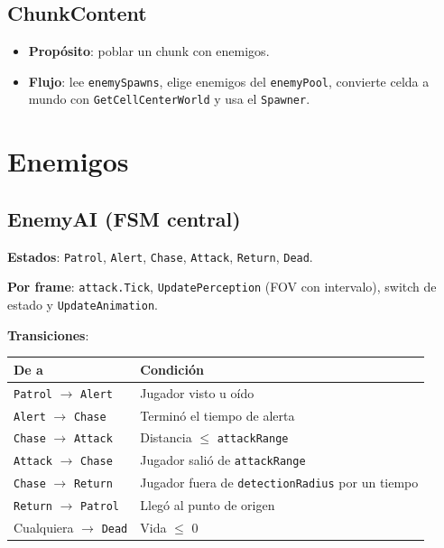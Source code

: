 \documentclass[a4paper,12pt]{article}
\begin{document}
\subsection{ChunkContent}

\begin{itemize}
    \item \textbf{Propósito}: poblar un chunk con enemigos.
    \item \textbf{Flujo}: lee \texttt{enemySpawns}, elige enemigos del \texttt{enemyPool}, convierte celda a mundo con \texttt{GetCellCenterWorld} y usa el \texttt{Spawner}.
\end{itemize}

\section{Enemigos}

\subsection{EnemyAI (FSM central)}

\textbf{Estados}: \texttt{Patrol}, \texttt{Alert}, \texttt{Chase}, \texttt{Attack}, \texttt{Return}, \texttt{Dead}.

\textbf{Por frame}: \texttt{attack.Tick}, \texttt{UpdatePerception} (FOV con intervalo), switch de estado y \texttt{UpdateAnimation}.

\textbf{Transiciones}:

\begin{center}
\begin{tabular}{|l|l|}
\hline
\textbf{De a} & \textbf{Condición} \\
\hline
\texttt{Patrol} $\to$ \texttt{Alert} & Jugador visto u oído \\
\hline
\texttt{Alert} $\to$ \texttt{Chase} & Terminó el tiempo de alerta \\
\hline
\texttt{Chase} $\to$ \texttt{Attack} & Distancia $\leq$ \texttt{attackRange} \\
\hline
\texttt{Attack} $\to$ \texttt{Chase} & Jugador salió de \texttt{attackRange} \\
\hline
\texttt{Chase} $\to$ \texttt{Return} & Jugador fuera de \texttt{detectionRadius} por un tiempo \\
\hline
\texttt{Return} $\to$ \texttt{Patrol} & Llegó al punto de origen \\
\hline
Cualquiera $\to$ \texttt{Dead} & Vida $\leq$ 0 \\
\hline
\end{tabular}
\end{center}
\end{document}
